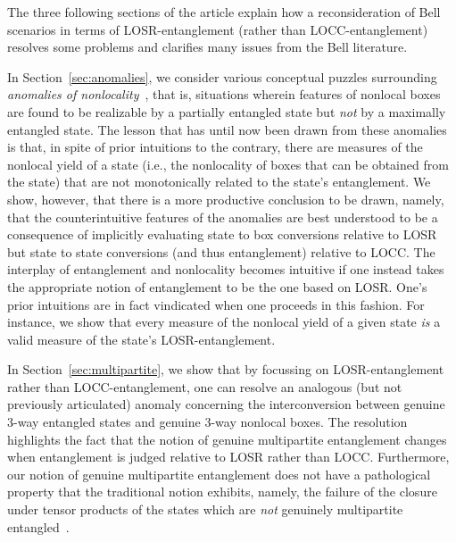 \documentclass[prx,11pt,letterpaper,twocolumn,accepted=2023-11-27]{quantumarticle}
\theoremstyle{plain}
\theoremstyle{definition}
\begin{document}
 
 
The three following sections of the article explain how a reconsideration of Bell scenarios in terms of LOSR-entanglement (rather than LOCC-entanglement) resolves some problems and clarifies many issues from the Bell literature.


In Section~\ref{sec:anomalies}, we consider various conceptual puzzles
 surrounding 
  {\em anomalies of nonlocality}~\cite{Methot2006anomaly,AnomalyExtra2005Scarani,AnomalyExtra2008Brunner,vidick2011more,AnomalyExtra2011Junge,Acin2012randomnessvsnonlocality,AnomalyExtra2014Tan,AnomalyExtra2015Augusiak,AnomalyExtra2015Fonseca,AnomalyExtra2016Bowles,AnomalyExtra2017Kabel,AnomalyExtra2018Curchod,AnomalyExtra2018Bamps,AnomalyExtra2018Chitambar,AnomalyExtra2018Lipinska,AnomalyExtra2018Barasinski},
that is, situations wherein features of nonlocal boxes
 are found to be realizable by a partially entangled state but {\em not} by a maximally entangled state.
The lesson that has until now been drawn from these  anomalies is that, in spite of prior intuitions to the contrary, there are measures of the nonlocal yield of a state (i.e., the nonlocality of boxes that can be obtained from the state) that are not monotonically related to the state's entanglement.
We show, however, that there is a more productive conclusion to be drawn, namely, that the counterintuitive features of the anomalies are best understood to be a consequence of implicitly evaluating state to box conversions relative to LOSR but state to state conversions (and thus entanglement) relative to LOCC.  
The interplay of entanglement and nonlocality becomes intuitive if one instead takes the appropriate notion of entanglement to be the one based on LOSR.
One's prior intuitions are in fact vindicated when one proceeds in this fashion.  For instance, we show that
 every measure of the nonlocal yield of a given state {\em is} a valid measure of the state's LOSR-entanglement.

In Section~\ref{sec:multipartite}, we show that by focussing on LOSR-entanglement rather than LOCC-entanglement,
 one can resolve an analogous (but not previously articulated) anomaly concerning the interconversion between genuine 3-way entangled states and genuine 3-way nonlocal boxes. The resolution highlights the fact that the notion of genuine multipartite entanglement changes when entanglement is judged relative to LOSR rather than LOCC. Furthermore, our notion of genuine multipartite entanglement does not have a pathological property that the traditional notion exhibits, namely, the failure of the closure under tensor products of the states which are {\em not} genuinely multipartite entangled~\cite{navascues2020genuine,contreras2021,MultipartiteProblem2020Luo}.
 
\end{document}
